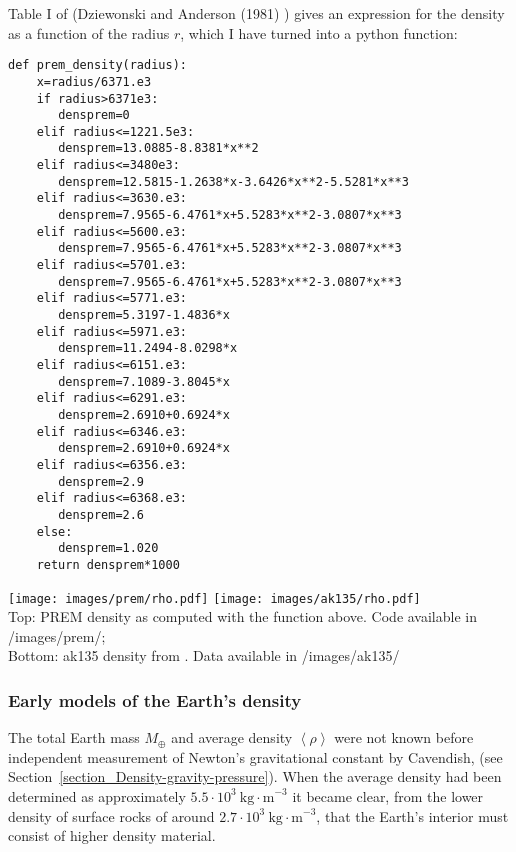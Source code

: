 Table I of (Dziewonski and Anderson (1981) \cite{dzan81}) gives 
an expression for the density as a function of the radius $r$, which 
I have turned into a python function:
\begin{lstlisting}
def prem_density(radius):
    x=radius/6371.e3
    if radius>6371e3:
       densprem=0
    elif radius<=1221.5e3:
       densprem=13.0885-8.8381*x**2
    elif radius<=3480e3:
       densprem=12.5815-1.2638*x-3.6426*x**2-5.5281*x**3
    elif radius<=3630.e3:
       densprem=7.9565-6.4761*x+5.5283*x**2-3.0807*x**3
    elif radius<=5600.e3:
       densprem=7.9565-6.4761*x+5.5283*x**2-3.0807*x**3
    elif radius<=5701.e3:
       densprem=7.9565-6.4761*x+5.5283*x**2-3.0807*x**3
    elif radius<=5771.e3:
       densprem=5.3197-1.4836*x
    elif radius<=5971.e3:
       densprem=11.2494-8.0298*x
    elif radius<=6151.e3:
       densprem=7.1089-3.8045*x
    elif radius<=6291.e3:
       densprem=2.6910+0.6924*x
    elif radius<=6346.e3:
       densprem=2.6910+0.6924*x
    elif radius<=6356.e3:
       densprem=2.9
    elif radius<=6368.e3:
       densprem=2.6
    else:
       densprem=1.020
    return densprem*1000
\end{lstlisting}

\begin{center}
\texttt{[image: images/prem/rho.pdf]}
\texttt{[image: images/ak135/rho.pdf]}\\
{\captionfont Top: PREM density as computed with the function above. 
Code available in /images/prem/; \\
Bottom: ak135 density from \cite{keeb95}.
Data available in /images/ak135/ } 
\end{center}



\subsubsection{Early models of the Earth's density}

The total Earth mass $M_{\oplus}$ and average density $\left <\rho \right >$
were not known 
before independent measurement of Newton's gravitational 
constant by Cavendish, 
(see Section~\ref{section_Density-gravity-pressure}).
When the average density had been determined as approximately 
$5.5 \cdot 10^3~\mathrm{kg\cdot m}^{-3}$ it became clear, 
from the lower density of surface rocks of around 
$2.7 \cdot 10^3~\mathrm{kg\cdot m}^{-3}$,
that the Earth's interior must consist of higher density material.

